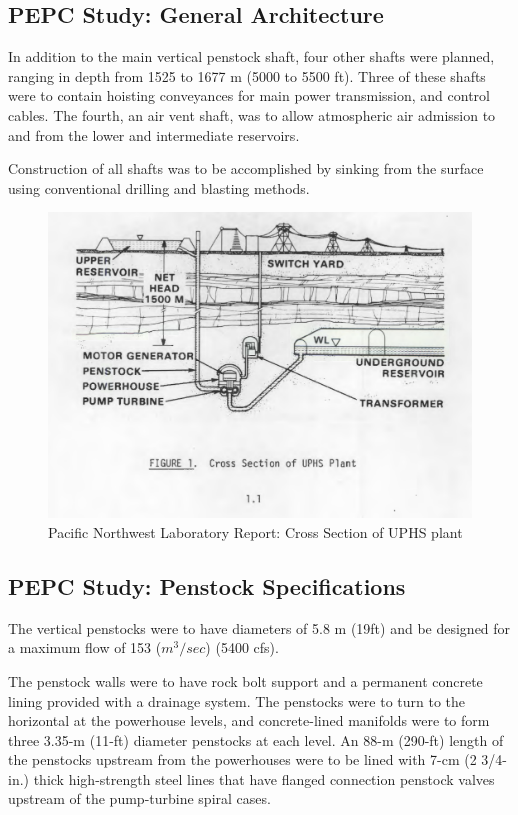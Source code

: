 \documentclass[hidelinks,12pt,a4paper]{article}
\begin{document}
\subsection{PEPC Study: General Architecture}
In addition to the main vertical penstock shaft, four
other shafts were planned, ranging in depth from 1525 to 1677 m (5000
to 5500 ft). Three of these shafts were to contain hoisting conveyances for main power transmission, and control cables. The fourth, an air vent shaft, was to allow atmospheric air admission to and from the lower and intermediate reservoirs.

Construction of all shafts was to be accomplished by sinking from the surface using conventional drilling and blasting methods.

\begin{figure}[ht!]
    \centering
    \includegraphics[width=1\textwidth]{pnl-report-diagram-1.png}
    \caption{Pacific Northwest Laboratory Report: Cross Section of UPHS plant \cite{UndergroundPumpedHydroelectricStorage}}
\end{figure}
\FloatBarrier

\subsection{PEPC Study: Penstock Specifications}
The vertical penstocks were to have diameters of 5.8 m (19ft) and be designed for a maximum flow of 153 ($m^3/sec$) (5400 cfs).

The penstock walls were to have rock bolt support and a permanent concrete lining provided with a drainage system. The penstocks were to turn to the horizontal at the powerhouse levels, and concrete-lined manifolds were to form three 3.35-m (11-ft) diameter penstocks at each level. An 88-m (290-ft) length of the penstocks upstream from the powerhouses were to be lined with 7-cm (2 3/4-in.) thick high-strength steel lines that have flanged connection penstock valves upstream of the pump-turbine spiral cases.
\end{document}
